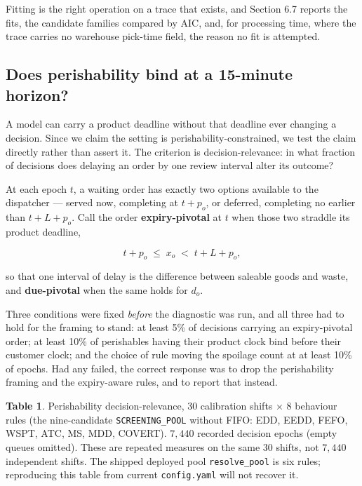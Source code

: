 \documentclass[review,3p,times]{elsarticle}
\theoremstyle{definition}
\begin{document}
Fitting is the right operation on a trace that exists, and Section 6.7
reports the fits, the candidate families compared by AIC, and, for
processing time, where the trace carries no warehouse pick-time field,
the reason no fit is attempted.

\subsection{Does perishability bind at a 15-minute
horizon?}\label{does-perishability-bind-at-a-15-minute-horizon}

A model can carry a product deadline without that deadline ever changing
a decision. Since we claim the setting is perishability-constrained, we
test the claim directly rather than assert it. The criterion is
decision-relevance: in what fraction of decisions does delaying an order
by one review interval alter its outcome?

At each epoch \(t\), a waiting order has exactly two options available
to the dispatcher --- served now, completing at \(t + p_o\), or
deferred, completing no earlier than \(t + L + p_o\). Call the order
\textbf{expiry-pivotal} at \(t\) when those two straddle its product
deadline,

\[ t + p_o \;\le\; x_o \;<\; t + L + p_o , \]

so that one interval of delay is the difference between saleable goods
and waste, and \textbf{due-pivotal} when the same holds for \(d_o\).

Three conditions were fixed \emph{before} the diagnostic was run, and
all three had to hold for the framing to stand: at least 5\% of
decisions carrying an expiry-pivotal order; at least 10\% of perishables
having their product clock bind before their customer clock; and the
choice of rule moving the spoilage count at at least 10\% of epochs. Had
any failed, the correct response was to drop the perishability framing
and the expiry-aware rules, and to report that instead.

\textbf{Table 1}. Perishability decision-relevance, 30 calibration
shifts × 8 behaviour rules (the nine-candidate \texttt{SCREENING\_POOL}
without FIFO: EDD, EEDD, FEFO, WSPT, ATC, MS, MDD, COVERT). \(7{,}440\)
recorded decision epochs (empty queues omitted). These are repeated
measures on the same 30 shifts, not \(7{,}440\) independent shifts. The
shipped deployed pool \texttt{resolve\_pool} is six rules; reproducing
this table from current \texttt{config.yaml} will not recover it.
\end{document}
